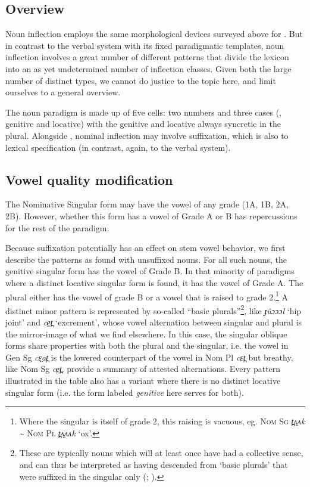 \documentclass[output=paper
,newtxmath
,modfonts
,nonflat]{langsci/langscibook}
\begin{document}
\subsection{Overview}

Noun inflection employs the same morphological devices surveyed above for . But in contrast to the verbal system with its fixed paradigmatic templates, noun inflection involves a great number of different patterns that divide the lexicon into an as yet undetermined number of inflection classes. Given both the large number of distinct types, we cannot do justice to the topic here, and limit ourselves to a general overview.

The noun paradigm is made up of five cells: two numbers and three cases (, genitive and locative) with the genitive and locative always syncretic in the plural. Alongside , nominal inflection may involve suffixation, which is also  to lexical specification (in contrast, again, to the verbal system). 

\subsection{Vowel quality modification} 

The Nominative Singular form may have the vowel of any grade (1A, 1B, 2A, 2B).  However, whether this form has a vowel of Grade A or B has repercussions for the rest of the paradigm.  

Because suffixation potentially has an effect on stem vowel behavior, we first describe the patterns as found with unsuffixed nouns. For all such nouns, the genitive singular form has the vowel of Grade B.  In that minority of paradigms where a distinct locative singular form is found, it has the vowel of Grade A.  The plural either has the vowel of grade B or a vowel that is raised to grade 2.\footnote{Where the singular is itself of grade 2, this raising is vacuous, eg. \textsc{Nom Sg} \textit{t̪}\textit{ʌ̤ʌk} {\textasciitilde} \textsc{Nom Pl} \textit{t̪}\textit{ʌ̤ʌʌk} ‘ox’.}  A distinct minor pattern is represented by so-called “basic plurals”\footnote{These are typically nouns which will at least once have had a collective sense, and can thus be interpreted as having descended from ‘basic plurals’ that were suffixed in the singular only (\citealt{Storch2005}; \citealt{Dimmendaal2000}).}, like \textit{ɟûɔɔɔl} ‘hip joint’ and \textit{ce̤t̪} ‘excrement’, whose vowel alternation between  singular and plural is the mirror-image of what we find elsewhere. In this case, the singular oblique forms share properties with both the  plural and the  singular, i.e. the vowel in Gen Sg \textit{cɛ̤at̪} is the lowered counterpart of the vowel in Nom Pl \textit{cɛt̪} but breathy, like Nom Sg \textit{ce̤t̪}.  provide a summary of attested  alternations.  Every pattern illustrated in the table also has a variant where there is no distinct locative singular form (i.e. the form labeled \textit{genitive} here serves for both).
\end{document}
